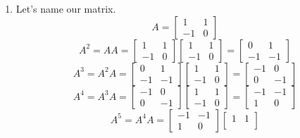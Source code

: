 \documentclass[12pt,letterpaper]{article}
\begin{document}
\begin{enumerate}
    \item
      Let's name our matrix.
      \[
        A =
        \begin{bmatrix}
          1  & 1  \\
          -1 & 0
        \end{bmatrix}
      \]
      \[
        A^2 = AA =
        \begin{bmatrix}
          1  & 1  \\
          -1 & 0
        \end{bmatrix}
        \begin{bmatrix}
          1  & 1  \\
          -1 & 0
        \end{bmatrix}
        =
        \begin{bmatrix}
          0  & 1  \\
          -1 & -1
        \end{bmatrix}
      \]
      \[
        A^3 = A^2A =
        \begin{bmatrix}
          0  & 1  \\
          -1 & -1
        \end{bmatrix}
        \begin{bmatrix}
          1  & 1  \\
          -1 & 0
        \end{bmatrix}
        =
        \begin{bmatrix}
          -1 & 0  \\
          0  & -1
        \end{bmatrix}
      \]
      \[
        A^4 = A^3A =
        \begin{bmatrix}
          -1 & 0  \\
          0  & -1
        \end{bmatrix}
        \begin{bmatrix}
          1  & 1  \\
          -1 & 0
        \end{bmatrix}
        =
        \begin{bmatrix}
          -1 & -1 \\
          1  & 0
        \end{bmatrix}
      \]
      \[
        A^5 = A^4A =
        \begin{bmatrix}
          -1 & -1 \\
          1  & 0
        \end{bmatrix}
        \begin{bmatrix}
          1  & 1  \\

\end{bmatrix}\]
\end{enumerate}
\end{document}
